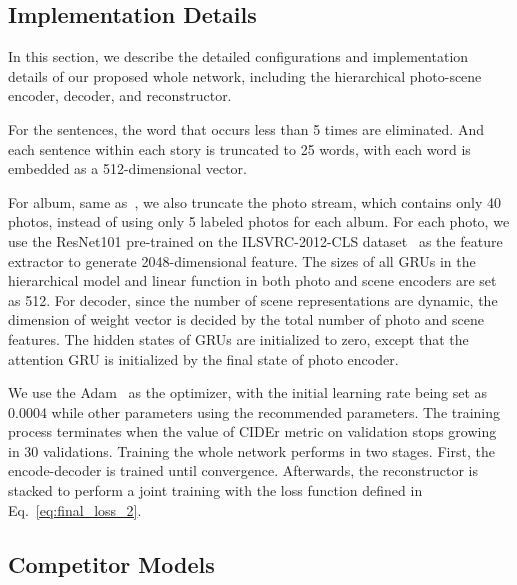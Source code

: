 \documentclass[letterpaper]{article} \usepackage{aaai19}  \usepackage{times}  \usepackage{helvet}  \usepackage{courier}  \usepackage{url}  \usepackage{graphicx}  \usepackage{color}
\begin{document}
\subsection{Implementation Details}
In this section, we describe the detailed configurations and implementation details of our proposed whole network, including the hierarchical photo-scene encoder, decoder, and reconstructor.


For the sentences, the word that occurs less than 5 times are eliminated.
And each sentence within each story is truncated to 25 words, with each word is embedded as a 512-dimensional vector.


For album, same as~\cite{yu2017hierarchically}, we also truncate the photo stream, which contains only 40 photos, instead of using only 5 labeled photos for each album. For each photo, we use the ResNet101 pre-trained on the ILSVRC-2012-CLS dataset~\cite{russakovsky2015imagenet} as the feature extractor to generate 2048-dimensional feature.
The sizes of all GRUs in the hierarchical model and linear function in both photo and scene encoders are set as 512.
For decoder, since the number of scene representations are dynamic, the dimension of weight vector is decided by the total number of photo and scene features. The hidden states of GRUs are initialized to zero, except that the attention GRU is initialized by the final state of photo encoder.

We use the Adam~\cite{kingma2014adam} as the optimizer, with the initial learning rate being set as 0.0004 while other parameters using the recommended parameters. The training process terminates when the value of CIDEr metric on validation stops growing in 30 validations.
Training the whole network performs in two stages. First, the encode-decoder is trained until convergence. Afterwards, the reconstructor is stacked to perform a joint training with the loss function defined in Eq.~\eqref{eq:final_loss_2}.

\subsection{Competitor Models}
\end{document}
